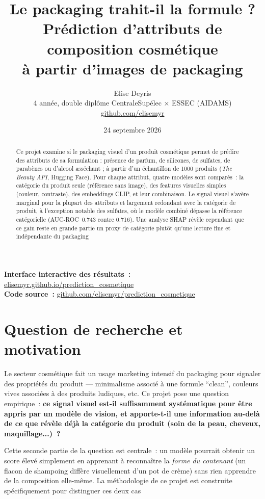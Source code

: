 \documentclass[11pt,a4paper]{article}
\title{\Huge\bfseries Le packaging trahit-il la formule ?\\[0.3em]
\Large\normalfont Prédiction d'attributs de composition cosmétique\\à partir d'images de packaging}
\author{Elise Deyris\\
\small 4\up{e} année, double diplôme CentraleSupélec × ESSEC (AIDAMS)\\
\small \href{https://github.com/elisemyr}{github.com/elisemyr}}
\date{24 septembre 2026}
\begin{document}
\maketitle

\begin{abstract}
\noindent
Ce projet examine si le packaging visuel d'un produit cosmétique permet de prédire des attributs de sa formulation : présence de parfum, de silicones, de sulfates, de parabènes ou d'alcool asséchant ; à partir d'un échantillon de 1000 produits (\emph{The Beauty API}, Hugging Face). Pour chaque attribut, quatre modèles sont comparés~: la catégorie du produit seule (référence sans image), des features visuelles simples (couleur, contraste), des embeddings CLIP, et leur combinaison. Le signal visuel s'avère marginal pour la plupart des attributs et largement redondant avec la catégorie de produit, à l'exception notable des sulfates, où le modèle combiné dépasse la référence catégorielle (AUC-ROC~0.743 contre 0.716). Une analyse SHAP révèle cependant que ce gain reste en grande partie un proxy de catégorie plutôt qu'une lecture fine et indépendante du packaging
\end{abstract}

\vspace{1em}
\noindent\textbf{Interface interactive des résultats~:} \href{https://elisemyr.github.io/prediction_cosmetique/}{elisemyr.github.io/prediction\_cosmetique}\\
\textbf{Code source~:} \href{https://github.com/elisemyr/prediction_cosmetique}{github.com/elisemyr/prediction_cosmetique}

\section{Question de recherche et motivation}

Le secteur cosmétique fait un usage marketing intensif du packaging pour signaler des propriétés du produit --- minimalisme associé à une formule ``clean'', couleurs vives associées à des produits ludiques, etc. Ce projet pose une question empirique~: \textbf{ce signal visuel est-il suffisamment systématique pour être appris par un modèle de vision, et apporte-t-il une information au-delà de ce que révèle déjà la catégorie du produit (soin de la peau, cheveux, maquillage...)~?}

Cette seconde partie de la question est centrale~: un modèle pourrait obtenir un score élevé simplement en apprenant à reconnaître la \emph{forme du contenant} (un flacon de shampoing diffère visuellement d'un pot de crème) sans rien apprendre de la composition elle-même. La méthodologie de ce projet est construite spécifiquement pour distinguer ces deux cas
\end{document}
